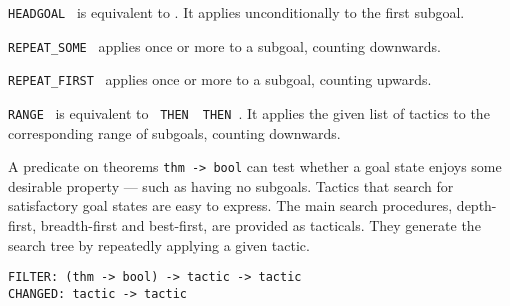 \begin{isabellebody}
\begin{isamarkuptext}
\begin{description}
  \item \verb|HEADGOAL|~ is equivalent to .
  It applies  unconditionally to the first subgoal.

  \item \verb|REPEAT_SOME|~ applies  once or
  more to a subgoal, counting downwards.

  \item \verb|REPEAT_FIRST|~ applies  once or
  more to a subgoal, counting upwards.

  \item \verb|RANGE|~ is equivalent to
  ~\verb|THEN|~~\verb|THEN|~.  It applies the given list of tactics to the
  corresponding range of subgoals, counting downwards.

  \end{description}%
\end{isamarkuptext}%
\isamarkuptrue%
%
\endisatagmlref
{\isafoldmlref}%
%
\isadelimmlref
%
\endisadelimmlref
%
\isamarkuptrue%
%
\begin{isamarkuptext}%
A predicate on theorems \verb|thm -> bool| can test
  whether a goal state enjoys some desirable property --- such as
  having no subgoals.  Tactics that search for satisfactory goal
  states are easy to express.  The main search procedures,
  depth-first, breadth-first and best-first, are provided as
  tacticals.  They generate the search tree by repeatedly applying a
  given tactic.%
\end{isamarkuptext}%
\isamarkuptrue%
%
\isamarkuptrue%
%
\begin{isamarkuptext}%
\begin{mldecls}
  \verb|FILTER: (thm -> bool) -> tactic -> tactic| \\
  \verb|CHANGED: tactic -> tactic| \\
  \end{mldecls}


\end{isamarkuptext}
\end{isabellebody}
